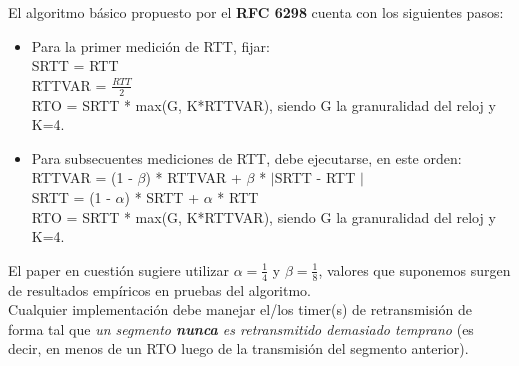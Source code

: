 \indent El algoritmo básico propuesto por el \textbf{RFC 6298} cuenta con los siguientes pasos:\\
\begin{itemize}
\item Para la primer medición de RTT, fijar:\\
SRTT = RTT\\
RTTVAR = $\frac{RTT}{2}$ \\
RTO = SRTT * max(G, K*RTTVAR), siendo G la granuralidad del reloj y K=4.\\
\item Para subsecuentes mediciones de RTT, debe ejecutarse, en este orden:\\
RTTVAR = (1 - $\beta$) * RTTVAR + $\beta$ * $|$SRTT - RTT $|$\\
SRTT = (1 - $\alpha$) * SRTT + $\alpha$ * RTT\\
RTO = SRTT * max(G, K*RTTVAR), siendo G la granuralidad del reloj y K=4.\\
\end{itemize}

\indent El paper en cuestión sugiere utilizar $\alpha = \frac{1}{4} $ y $\beta = \frac{1}{8}$, valores que suponemos surgen de resultados empíricos en pruebas del algoritmo.\\

\indent Cualquier implementación debe manejar el/los timer(s) de retransmisión
de forma tal que \textit{un segmento \textbf{nunca} es retransmitido demasiado
temprano} (es decir, en menos de un RTO luego de la transmisión del segmento
anterior).\\

